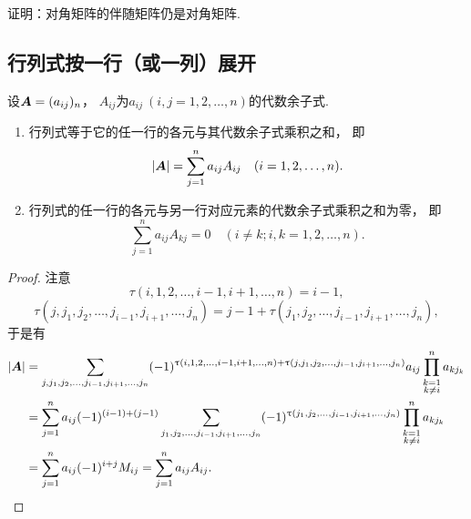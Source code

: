 \begin{example}
证明：对角矩阵的伴随矩阵仍是对角矩阵.
\end{example}

\subsection{行列式按一行（或一列）展开}
\begin{theorem}\label{theorem:行列式.行列式按行展开}
设\(\boldsymbol{A}=(a_{ij})_n\)，
\(A_{ij}\)为\(a_{ij}\ (i,j=1,2,\dotsc,n)\)的代数余子式.
\begin{enumerate}
	\item 行列式等于它的任一行的各元与其代数余子式乘积之和，
	即\begin{equation}
		\abs{\boldsymbol{A}} = \sum_{j=1}^n a_{ij} A_{ij}
		\quad(i=1,2,\dotsc,n).
	\end{equation}

	\item 行列式的任一行的各元与另一行对应元素的代数余子式乘积之和为零，
	即\begin{equation}
		\sum_{j=1}^n a_{ij} A_{kj} = 0
		\quad(i \neq k;
		i,k=1,2,\dotsc,n).
	\end{equation}
\end{enumerate}
\begin{proof}
注意\begin{equation*}
	\tau(i,1,2,\dotsc,i-1,i+1,\dotsc,n) = i-1,
\end{equation*}\begin{equation*}
	\tau(j,j_1,j_2,\dotsc,j_{i-1},j_{i+1},\dotsc,j_n)
	= j-1+\tau(j_1,j_2,\dotsc,j_{i-1},j_{i+1},\dotsc,j_n),
\end{equation*}于是有\begin{align*}
	\abs{\boldsymbol{A}}
	&= \sum_{j,j_1,j_2,\dotsc,j_{i-1},j_{i+1},\dotsc,j_n}
		(-1)^{\uptau(i,1,2,\dotsc,i-1,i+1,\dotsc,n) + \uptau(j,j_1,j_2,\dotsc,j_{i-1},j_{i+1},\dotsc,j_n)}
		a_{ij} \prod_{\substack{k=1 \\ k \neq i}}^n a_{k j_k} \\
	&= \sum_{j=1}^n a_{ij} (-1)^{(i-1)+(j-1)}
		\sum_{j_1,j_2,\dotsc,j_{i-1},j_{i+1},\dotsc,j_n}
			(-1)^{\uptau(j_1,j_2,\dotsc,j_{i-1},j_{i+1},\dotsc,j_n)}
				\prod_{\substack{k=1 \\ k \neq i}}^n a_{k j_k} \\
	&= \sum_{j=1}^n a_{ij} (-1)^{i+j} M_{ij}
	= \sum_{j=1}^n a_{ij} A_{ij}.
	\qedhere
\end{align*}
\end{proof}
\end{theorem}

